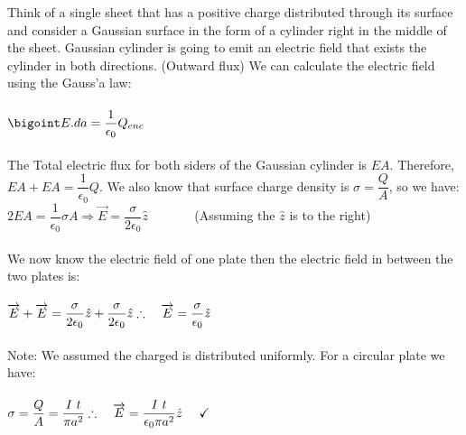 \documentclass[fleqn]{article}
\begin{document}
\begin{enumerate}
\begin{enumerate}
        \textcolor{hwColor}{
          Think of a single sheet that has a positive charge distributed through its surface and 
          consider a Gaussian surface in the form of a cylinder right in the middle of the sheet. Gaussian cylinder
          is going to emit an electric field that exists the cylinder in both directions. (Outward flux)
          We can calculate the electric field using the Gauss'a law: 
          \\
          \\
          $
            \bigoint E.da=\dfrac{1}{\epsilon_0} Q_{enc}
          $
          \\
          \\
          The Total electric flux for both siders of the Gaussian cylinder is $EA$. Therefore, $EA+EA=\dfrac{1}{\epsilon_0} Q$.
          We also know that surface charge density is $\sigma=\dfrac{Q}{A}$, so we have:
          \\
          $
            2EA=\dfrac{1}{\epsilon_0} \sigma A \Longrightarrow \overrightarrow{E}=\dfrac{\sigma}{2 \epsilon_0} \hat{z}
          $
          ~~~~~~ (Assuming the $\hat{z}$ is to the right)
          \\
          \\
          We now know the electric field of one plate then the electric field in between the two plates is:
          \\
          \\
          $
            \overrightarrow{E}+\overrightarrow{E}=\dfrac{\sigma}{2 \epsilon_0} \hat{z}+\dfrac{\sigma}{2 \epsilon_0} \hat{z}
            \\
            \\
            \\
            \therefore ~~~ \overrightarrow{E}=\dfrac{\sigma}{\epsilon_0} \hat{z}
          $
          \\
          \\
          Note: We assumed the charged is distributed uniformly. For a circular plate we have:
          \\
          \\
          $
            \sigma=\dfrac{Q}{A}=\dfrac{I ~ t}{\pi a^2}
            \\
            \\
            \\
            \therefore ~~~ \overrightarrow{E}=\dfrac{I ~ t}{\epsilon_0 \pi a^2} \hat{z} ~~~~ \checkmark
          $
          \\
}
\end{enumerate}
\end{enumerate}
\end{document}
